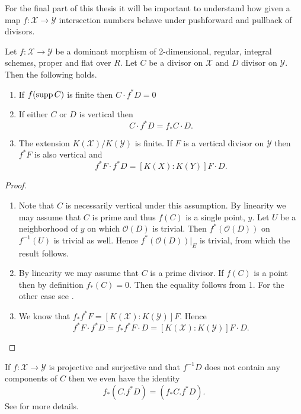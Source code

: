 For the final part of this thesis it will be important to understand how given a map $f: \mathscr X \to \mathscr Y$ intersection numbers behave under pushforward and pullback of divisors. 

\begin{theorem}
	Let $f:\mathscr X \to \mathscr Y$ be a dominant morphism of 2-dimensional, regular, integral schemes, proper and flat over $R$. 
	Let $C$ be a divisor on $\mathscr X$ and $D$ divisor on $\mathscr Y$. 
	Then the following holds.
	\begin{enumerate}
		\item If $f(\operatorname{supp} C)$ is finite then $C\cdot f^* D = 0$ 
		\item If either $C$ or $D$ is vertical then \begin{equation}\label{eq:projection_formula}
				C\cdot f^* D = f_* C \cdot D
			.\end{equation}
		\item The extension $K(\mathscr X) / K(\mathscr Y)$ is finite. 
			If $F$ is a vertical divisor on $\mathscr Y$ then $f^* F$ is also vertical and \[
				f^* F \cdot f^* D = [K(X): K(Y)] F \cdot D
			.\] 
	\end{enumerate}
\end{theorem}
\begin{proof}
	\begin{enumerate}
		\item Note that $C$ is necessarily vertical under this assumption. 
			By linearity we may assume that $C$ is prime and thus $f(C)$ is a single point, $y$. 
			Let $U$ be a neighborhood of  $y$ on which $\mathcal{O}(D)$ is trivial. 
			Then $f^*(\mathcal{O}(D))$ on $f^{-1}(U)$ is trivial as well. 
			Hence $f^*(\mathcal{O}(D))|_E$ is trivial, from which the result follows.
		\item By linearity we may assume that $C$ is a prime divisor.
			If $f(C)$ is a point then by definition $f_*(C) = 0$. Then the equality follows from 1. 
			For the other case see \cite[thm.\ 9.2.12]{liuAlgebraicGeometryArithmetic2002}. 
		\item 
			We know that $f_* f^* F = [K(\mathscr X): K(\mathscr Y)] F$. Hence  \[
				f^* F \cdot  f^* D = f_* f^* F \cdot D = [K(\mathscr X) : K(\mathscr Y)] F \cdot  D
			.\] 

	\end{enumerate}
\end{proof}

\begin{remark}\label{rem:local_projection_formula}
	If $f: \mathscr X \to \mathscr Y$ is projective and surjective and that $f^{-1}D$ does not contain any components of $C$ then we even have the identity  \[
		f_*(C . f^*D) = (f_*C . f^* D)
	.\] 
	See \cite[rem.\ 9.2.13]{liuAlgebraicGeometryArithmetic2002} for more details. 
\end{remark}
